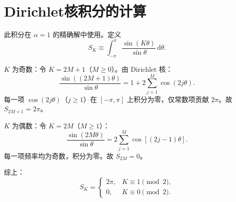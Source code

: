 \documentclass{article} %
\newcommand{\di}{\mathrm{d}}
\begin{document}
\section{Dirichlet核积分的计算}\label{D}

此积分在 $\alpha=1$ 的精确解中使用。定义
\begin{equation}
  S_K\equiv\int_{-\pi}^{\pi}\dfrac{\sin(K\theta)}{\sin\theta}\,\di\theta.
\end{equation}

$K$ 为奇数：令 $K=2M+1$（$M\ge 0$）。由 Dirichlet 核：
\begin{equation}
    \frac{\sin((2M+1)\theta)}{\sin\theta} = 1 + 2\sum_{j=1}^{M}\cos(2j\theta).
\end{equation}
每一项 $\cos(2j\theta)$（$j\ge 1$）在 $[-\pi,\pi]$ 上积分为零，仅常数项贡献 $2\pi$。故 $S_{2M+1} = 2\pi$。

$K$ 为偶数：令 $K=2M$（$M\ge 1$）：
\begin{equation}
    \dfrac{\sin(2M\theta)}{\sin\theta} = 2\sum_{j=1}^{M}\cos[(2j-1)\theta].
\end{equation}
每一项频率均为奇数，积分为零。故 $S_{2M} = 0$。

综上：
\begin{equation}
    \boxed{
    S_K =
    \begin{cases}
        2\pi, & K \equiv 1 \pmod{2},\\
        0, & K \equiv 0 \pmod{2}.
    \end{cases}
    }
    \label{eq:C1}
\end{equation}
\end{document}
